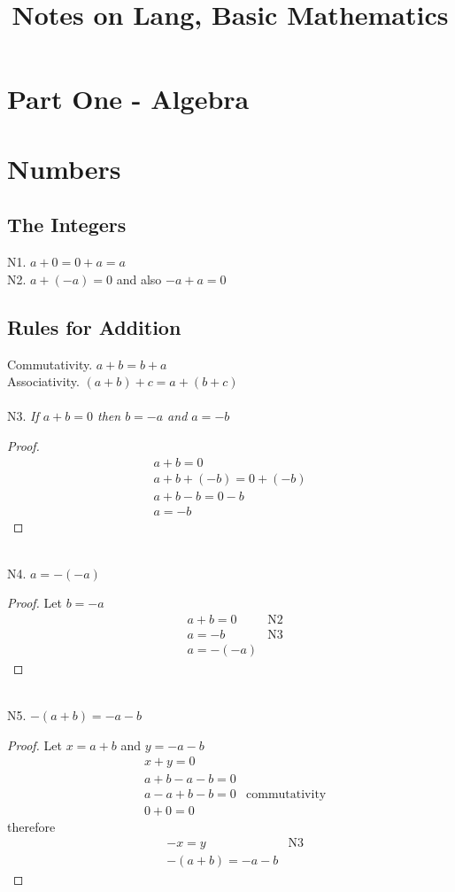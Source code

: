 \documentclass{article}
\title{Notes on Lang, Basic Mathematics} %
\begin{document}
\section*{Part One - Algebra} %
\section{Numbers} %
\subsection{The Integers}
N1. $a + 0 = 0 + a = a$ \\
N2. $a + (-a) = 0$ and also $-a + a = 0$
\subsection{Rules for Addition}
Commutativity.  $a + b = b + a$ \\
Associativity.  $(a + b) + c = a + (b + c)$ \\

\leavevmode \\ %
N3. \textit{If $a + b = 0$ then $b = -a$ and $a = -b$}
\begin{proof}
 \begin{align*}
	&a + b = 0 \\
	&a + b + (-b) = 0 + (-b) \\
	&a + b - b = 0 - b \\
	&a = -b &
 \end{align*}
\end{proof}

\leavevmode \\
N4. $a = -(-a)$ \\
\begin{proof}
Let $b = -a$
\begin{align*}
&a + b = 0	&\text{N2}\\
&a = -b		&\text{N3}\\
&a = -(-a)
\end{align*}
\end{proof}

\leavevmode \\
N5. $-(a+b) = -a - b$ \\
\begin{proof}
Let $x = a+b$ and $y = -a - b$
\begin{align*}
&x + y = 0 \\
&a + b - a - b = 0 \\
&a - a + b - b = 0 &\text{commutativity} \\
&0 + 0 = 0
\end{align*}
therefore
\begin{align*}
&-x = y &\text{N3} \\
&-(a+b) = -a - b
\end{align*}
\end{proof}
\end{document}
